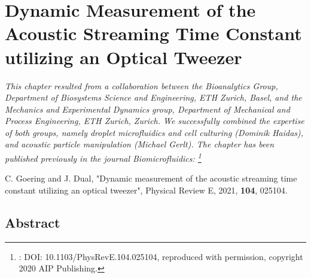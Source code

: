 \renewcommand{\relPath}{SECTION/30_Timeconstant}
 
\chapter[Dynamic Timeconstant Measurement]{Dynamic Measurement of the Acoustic 
Streaming Time Constant utilizing an Optical Tweezer}\label{ch:timeconstant}
\textit{This chapter resulted from a collaboration between the Bioanalytics 
  Group, Department of Biosystems Science and Engineering, ETH Zurich, Basel, 
  and the Mechanics and Experimental Dynamics group, Department of Mechanical 
  and Process Engineering, ETH Zurich, Zurich. We successfully combined the 
  expertise of both groups, namely droplet microfluidics and cell culturing 
  (Dominik Haidas), and acoustic particle manipulation (Michael Gerlt). The 
  chapter has been published previously in the journal Biomicrofluidics:
\footnote{: DOI: 10.1103/PhysRevE.104.025104, reproduced with permission, 
copyright 2020 AIP Publishing.}}

\vspace{5mm} \noindent
C. Goering and J. Dual, "Dynamic measurement of the acoustic streaming time 
constant utilizing an optical tweezer", Physical Review E, 2021, \textbf{104}, 
025104.


\section{Abstract}







